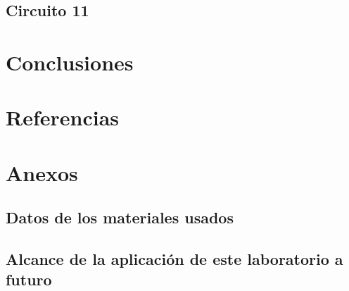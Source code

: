 \documentclass{extbook}
\begin{document}
\section{Circuito 11}

\chapter{Conclusiones}

\chapter{Referencias}

\chapter{Anexos}
\section{Datos de los materiales usados}

\section{Alcance de la aplicación de este laboratorio a futuro}

\end{document}
